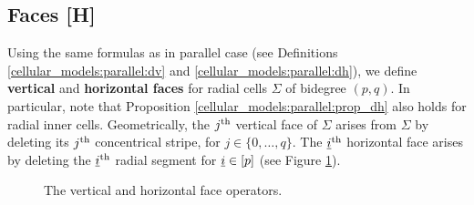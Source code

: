 \subsection{Faces [H]}
\label{cellular_models:radial:faces}

Using the same formulas as in parallel case (see Definitions \ref{cellular_models:parallel:dv} and \ref{cellular_models:parallel:dh}), 
we define \textbf{vertical} and \textbf{horizontal faces} for radial cells $\Sigma$ of bidegree $(p, q)$.
In particular, note that Proposition \ref{cellular_models:parallel:prop_dh} also holds for radial inner cells.
Geometrically, the $j^{\text{th}}$ vertical face of $\Sigma$ arises from $\Sigma$ by deleting its $j^{\text{th}}$ concentrical stripe, 
for $j \in \{0, \dotsc, q\}$.
The $\underline{\smash{i}}^{\text{th}}$ horizontal face arises by deleting the $\underline{\smash{i}}^{\text{th}}$ radial segment for $\underline{\smash{i}} \in [p]$ (see Figure \ref{cellular_models:radial:comparison_face_operators}).
\begin{figure}[ht]
\centering
{}
\caption{\label{cellular_models:radial:comparison_face_operators}The vertical and horizontal face operators.}
\end{figure}
